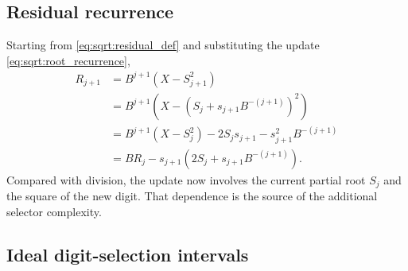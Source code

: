 \documentclass[11pt]{article}
\numberwithin{equation}{section}
\begin{document}
\subsection{Residual recurrence}
\label{ssec:sqrt:residual_recurrence}

Starting from \cref{eq:sqrt:residual_def} and substituting the update
\cref{eq:sqrt:root_recurrence},
\begin{align}
  R_{j+1}
  &= B^{j+1}(X-S_{j+1}^2) \nonumber \\
  &= B^{j+1}\left(X-\left(S_j+s_{j+1}B^{-(j+1)}\right)^2\right) \nonumber \\
  &= B^{j+1}(X-S_j^2) - 2S_js_{j+1} - s_{j+1}^2B^{-(j+1)} \nonumber \\
  &= BR_j - s_{j+1}\left(2S_j+s_{j+1}B^{-(j+1)}\right).
  \label{eq:sqrt:residual_recurrence}
\end{align}
Compared with division, the update now involves the current partial root $S_j$ and the square of the
new digit.
That dependence is the source of the additional selector complexity.

\subsection{Ideal digit-selection intervals}
\label{ssec:sqrt:ideal_intervals}
\end{document}
